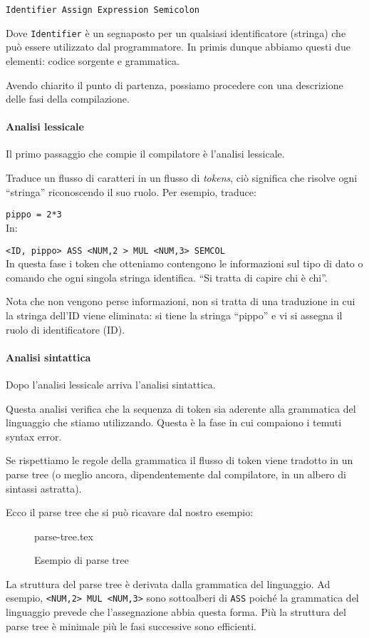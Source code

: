 \documentclass[class=book, crop=false, oneside, 12pt]{standalone}
\begin{document}
\texttt{Identifier Assign Expression Semicolon}

Dove \texttt{Identifier} è un segnaposto per un qualsiasi identificatore (stringa) che può essere utilizzato dal programmatore.
In primis dunque abbiamo questi due elementi: codice sorgente e grammatica.

Avendo chiarito il punto di partenza, possiamo procedere con una descrizione delle fasi della compilazione.

\paragraph{Analisi lessicale}
Il primo passaggio che compie il compilatore è l’analisi lessicale.

Traduce un flusso di caratteri in un flusso di \emph{tokens}, ciò significa che risolve ogni “stringa” riconoscendo il suo ruolo. Per esempio, traduce:

\texttt{pippo = 2*3}\\
In:

\texttt{<ID, pippo> ASS <NUM,2 > MUL <NUM,3> SEMCOL}\\
In questa fase i token che otteniamo contengono le informazioni sul tipo di dato o comando che ogni singola stringa identifica. “Si tratta di capire chi è chi”.

Nota che non vengono perse informazioni, non si tratta di una traduzione in cui la stringa dell’ID viene eliminata: si tiene la stringa “pippo” e vi si assegna il ruolo di identificatore (ID).

\paragraph{Analisi sintattica}
Dopo l’analisi lessicale arriva l’analisi sintattica.

Questa analisi verifica che la sequenza di token sia aderente alla grammatica del linguaggio che stiamo utilizzando. Questa è la fase in cui compaiono i temuti syntax error.

Se rispettiamo le regole della grammatica il flusso di token viene tradotto in un parse tree (o meglio ancora, dipendentemente dal compilatore, in un albero di sintassi astratta).

Ecco il parse tree che si può ricavare dal nostro esempio:
\begin{figure}[H]
	\centering
	{parse-tree.tex}
	\caption{Esempio di parse tree}
\end{figure}
La struttura del parse tree è derivata dalla grammatica del linguaggio. Ad esempio, \texttt{<NUM,2> MUL <NUM,3>} sono sottoalberi di \texttt{ASS} poiché la grammatica del linguaggio prevede che l’assegnazione abbia questa forma.
Più la struttura del parse tree è minimale più le fasi successive sono efficienti.
\end{document}
